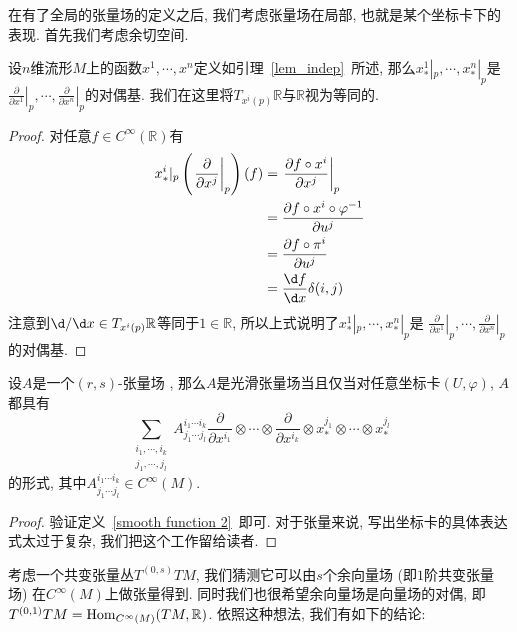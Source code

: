 在有了全局的张量场的定义之后, 我们考虑张量场在局部, 也就是某个坐标卡下的表现.
首先我们考虑余切空间.
\begin{lem}
    设$n$维流形$M$上的函数$x^1,\cdots,x^n$定义如引理~\ref{lem_indep}~所述, 那么$x^1_*|_p,\cdots,x^n_*|_p$是
    $\displaystyle\left.\frac{\partial}{\partial x^1}\right|_p,\cdots,\left.\frac{\partial}{\partial x^n}\right|_p$的对偶基.
    我们在这里将$T_{x^i(p)}\mathbb{R}$与$\mathbb{R}$视为等同的.
\end{lem}
\begin{proof}
    对任意$f\in C^\infty(\mathbb{R})$有
    \begin{align*}
        x^i_*|_p\left(\left.\frac{\partial}{\partial x^j}\right|_p\right)(f)&=\left.\frac{\partial f\circ x^i}{\partial x^j}\right|_p\\
        &=\frac{\partial f\circ x^i\circ\varphi^{-1}}{\partial u^j}\\
        &=\frac{\partial f\circ\pi^i}{\partial u^j}\\
        &=\frac{\d f}{\d x}\delta(i,j)
    \end{align*}
    注意到$\d/\d x\in T_{x^i(p)}\mathbb{R}$等同于$1\in\mathbb{R}$, 所以上式说明了$x^1_*|_p,\cdots,x^n_*|_p$是
    $\displaystyle\left.\frac{\partial}{\partial x^1}\right|_p,\cdots,\left.\frac{\partial}{\partial x^n}\right|_p$的对偶基.
\end{proof}

\begin{prop}\label{local tensor field}
    设$A$是一个$(r,s)$-张量场 , 那么$A$是光滑张量场当且仅当对任意坐标卡$(U,\varphi)$, $A$都具有
    \begin{equation}
        \sum_{\substack{i_1,\cdots,i_k\\j_1,\cdots,j_l}}A^{i_1\cdots i_k}_{j_1\cdots j_l}\frac{\partial}{\partial x^{i_1}}\otimes\cdots\otimes\frac{\partial}{\partial x^{i_k}}\otimes x^{j_1}_*\otimes\cdots\otimes x^{j_l}_*\label{eq_local_tensorfield}
    \end{equation}
    的形式, 其中$A^{i_1\cdots i_k}_{j_1\cdots j_l}\in C^\infty(M)$.
\end{prop}
\begin{proof}
    验证定义~\ref{smooth function 2}~即可.
    对于张量来说, 写出坐标卡的具体表达式太过于复杂, 我们把这个工作留给读者.
\end{proof}

考虑一个共变张量丛$T^{(0,s)}TM$, 我们猜测它可以由$s$个余向量场 (即$1$阶共变张量场) 在$C^\infty(M)$上做张量得到.
同时我们也很希望余向量场是向量场的对偶, 即$T^{(0,1)}TM=\operatorname{Hom}_{C^\infty(M)}(TM,\mathbb{R})$.
依照这种想法, 我们有如下的结论:

